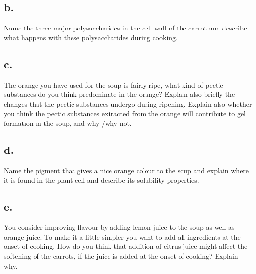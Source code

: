 \subsection*{b.}
Name the three major polysaccharides in the cell wall of the carrot and describe what happens with these polysaccharides during cooking.

\subsection*{c.}
The orange you have used for the soup is fairly ripe, what kind of pectic substances do you think predominate in the orange? Explain also briefly the changes that the pectic substances undergo during ripening. Explain also whether you think the pectic substances extracted from the orange will contribute to gel formation in the soup, and why /why not.

\subsection*{d.}
Name the pigment that gives a nice orange colour to the soup and explain where it is found in the plant cell and describe its solubility properties.

\subsection*{e.}
You consider improving flavour by adding lemon juice to the soup as well as orange juice. To make it a little simpler you want to add all ingredients at the onset of cooking. How do you think that addition of citrus juice might affect the softening of the carrots, if the juice is added at the onset of cooking? Explain why.




